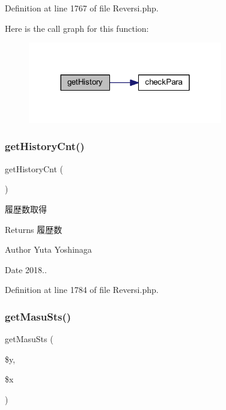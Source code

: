 Definition at line 1767 of file Reversi.\+php.

Here is the call graph for this function\+:\nopagebreak
\begin{figure}[H]
\begin{center}
\leavevmode
\includegraphics[width=240pt]{class_reversi_a41cae82a798f2b3d0684bda44b837fcf_cgraph}
\end{center}
\end{figure}
\mbox{\label{class_reversi_a004834cf9f95ab56b62c1305bbc68ce2}} 
\subsubsection{\texorpdfstring{get\+History\+Cnt()}{getHistoryCnt()}}
{\footnotesize\ttfamily get\+History\+Cnt (\begin{DoxyParamCaption}{ }\end{DoxyParamCaption})}



履歴数取得 

\begin{DoxyReturn}{Returns}
履歴数 
\end{DoxyReturn}
\begin{DoxyAuthor}{Author}
Yuta Yoshinaga 
\end{DoxyAuthor}
\begin{DoxyDate}{Date}
2018.. 
\end{DoxyDate}


Definition at line 1784 of file Reversi.\+php.

\mbox{\label{class_reversi_a1baed538e7a503cd51850d368b9e65f7}} 
\subsubsection{\texorpdfstring{get\+Masu\+Sts()}{getMasuSts()}}
{\footnotesize\ttfamily get\+Masu\+Sts (\begin{DoxyParamCaption}\item[{}]{\$y,  }\item[{}]{\$x }\end{DoxyParamCaption})}



